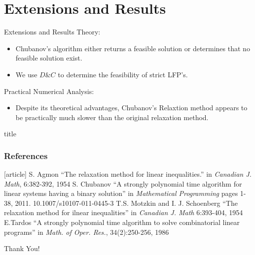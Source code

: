 \documentclass{beamer}
\begin{document}
\section{Extensions and Results}

\begin{frame}{Extensions and Results}
Theory:
\begin{itemize}
 \item Chubanov's algorithm either returns a feasible solution or determines that no feasible solution exist.
 \item We use $D\&C$ to determine the feasibility of strict LFP's. 
\end{itemize}
Practical Numerical Analysis:
\begin{itemize}
 \item Despite its theoretical advantages, Chubanov's Relaxtion method appears to be practically much slower than the original relaxation method.
\end{itemize}

\end{frame}


\begin{thebibliography}{99}
\begin{frame}[allowframebreaks]{title}
\frametitle{References}
{\scriptsize
{}[article]
\bibitem{}
S. Agmon ``The relaxation method for linear inequalities.'' in \emph{Canadian J. Math}, 6:382-392, 1954
\bibitem{}
S. Chubanov ``A strongly polynomial time algorithm for linear systems having a binary solution'' in \emph{Mathematical Programming} pages 1-38, 2011. 10.1007/s10107-011-0445-3
\bibitem{}
T.S. Motzkin and I. J. Schoenberg ``The relaxation method for ilnear inequalities'' in \emph{Canadian J. Math} 6:393-404, 1954
\bibitem{}
E.Tardos ``A strongly polynomial time algorithm to solve combinatorial linear programs'' in \emph{Math. of Oper. Res.}, 34(2):250-256, 1986

}
\end{frame}
\end{thebibliography}


\begin{frame}
\thispagestyle{empty}
\begin{center}
\Huge Thank You!
\end{center}
\vspace*{10pt}
\vspace*{10pt}
\vspace*{10pt}
\vspace*{10pt}
\vspace*{10pt}
\vspace*{10pt}
\vspace*{10pt}

\end{frame}
\end{document}
